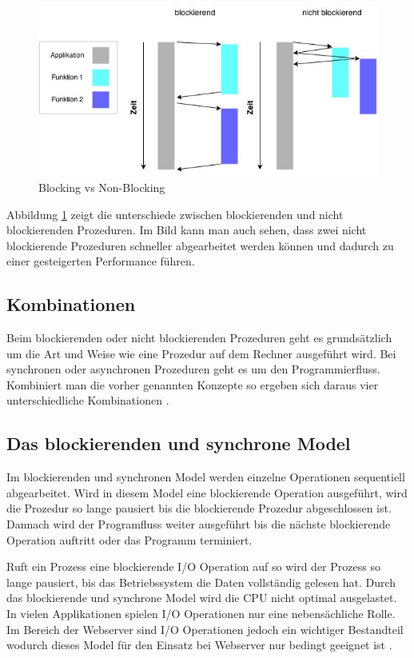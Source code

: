 \begin{figure}[!htb]
  \centering
  \includegraphics[width=13cm]{images/blocking_vs_nonblocking.jpg}
  \caption{
    Blocking vs Non-Blocking
  }
  \label{figure:blocking_vs_non_blocking}
\end{figure}

Abbildung \ref{figure:blocking_vs_non_blocking} zeigt die unterschiede zwischen blockierenden und nicht blockierenden Prozeduren. Im Bild kann man auch sehen, dass zwei nicht blockierende Prozeduren schneller abgearbeitet werden können und dadurch zu einer gesteigerten Performance führen. 

\subsection{Kombinationen}
Beim blockierenden oder nicht blockierenden Prozeduren geht es grundsätzlich um die Art und Weise wie eine Prozedur auf dem Rechner ausgeführt wird. Bei synchronen oder asynchronen Prozeduren geht es um den Programmierfluss. Kombiniert man die vorher genannten Konzepte so ergeben sich daraus vier unterschiedliche Kombinationen \cite[p. 48]{Erb2012}. 

\subsection{Das blockierenden und synchrone Model}
Im blockierenden und synchronen Model werden einzelne Operationen sequentiell abgearbeitet. Wird in diesem Model eine blockierende Operation ausgeführt, wird die Prozedur so lange pausiert bis die blockierende Prozedur abgeschlossen ist. Dannach wird der Programfluss weiter ausgeführt bis die nächste blockierende Operation auftritt oder das Programm terminiert.

Ruft ein Prozess eine blockierende I/O Operation auf so wird der Prozess so lange pausiert, bis das Betriebssystem die Daten vollständig gelesen hat. Durch das blockierende und synchrone Model wird die CPU nicht optimal ausgelastet. In vielen Applikationen spielen I/O Operationen nur eine nebensächliche Rolle. Im Bereich der Webserver sind I/O Operationen jedoch ein wichtiger Bestandteil wodurch dieses Model für den Einsatz bei Webserver nur bedingt geeignet ist \cite[p. 48]{Erb2012}.


